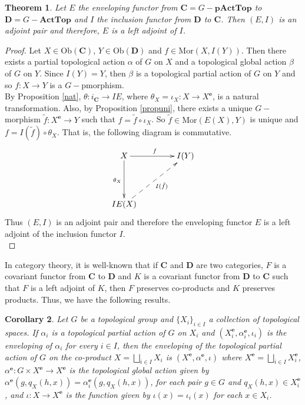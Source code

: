 \documentclass[sn-mathphys-num]{sn-jnl}%
\theoremstyle{thmstyleone}%
\newtheorem{theorem}{Theorem}%
\newtheorem{corollary}[theorem]{Corollary}%
\theoremstyle{thmstyletwo}%
\theoremstyle{thmstylethree}%
\begin{document}
\begin{theorem}\label{adjizq}
Let $E$ the enveloping functor from $\mathbf{C}=G-\mathbf{pActTop}$ to $\mathbf{D}=G-\mathbf{ActTop}$  and $I$
the inclusion functor from $\mathbf{D}$ to $\mathbf{C}$. Then $(E,I)$ is an adjoint pair and therefore, $ E $ is a left adjoint  of $ I $.
\end{theorem}
\begin{proof}
Let $X\in \text{Ob}(\mathbf{C})$, $Y\in \text{Ob}(\mathbf{D})$ and $f\in\text{Mor}(X,I(Y))$.  Then there exists a partial topological action $ \alpha $ of $ G $ on $ X $ and a topological global  action $\beta $ of $ G $ on $ Y $. Since $ I (Y) = Y $, then $\beta$ is a topological partial action of $ G $ on $ Y $ and so $ f: X \to Y $ is a $G-$pmorphism.\\

By Proposition \ref{nat}, $\theta: i_{\mathbf{C}} \to IE$, where $\theta_X=\iota_X:X\to X^\mathbf{e}$,
 is a natural transformation. Also, by Proposition \ref{propuni}, there exists a unique $ G-$morphism $\tilde{f}:X^\mathbf{e}\to Y$ such that $f=\tilde{f}\circ \iota_X$. So $\tilde{f}\in \text{Mor}(E(X),Y)$ is unique and $f=I(\tilde{f})\circ \theta_X$. That is, the following diagram is commutative.
$$
\xymatrix@=1.5cm{
X \ar[r]^f \ar[d]_{\theta_X} & I(Y)\\
IE(X)\ar@{-->}[ur]_{I(\tilde{f})}&
}
$$
Thus $(E,I)$ is an adjoint pair and therefore the enveloping functor $E$ is a left adjoint of the inclusion functor $I$.\\
\end{proof}
In category theory, it is well-known that if $\mathbf{C}$ and $\mathbf{D}$ are two categories, $ F $ is a covariant functor from $\mathbf{C}$  to \textbf{D} and $K$ is a covariant functor from $\mathbf{D}$ to $\mathbf{C}$ such that $ F $ is a left adjoint of $ K$, then $ F $ preserves co-products and $ K $ preserves products. Thus,  we have the following results.\\
\begin{corollary}
Let $ G $ be a topological group and $\{X_i\}_{i\in I}$ a collection of topological spaces. If $ \alpha_i $ is a topological partial action of $ G $ on $ X_i $ and $(X_i^\mathbf{e},\alpha^\mathbf{e}_i,\iota_i)$ is the enveloping of $ \alpha_i $ for every $ i \in I $, then the enveloping of the topological partial action of $ G $ on the co-product  $X=\bigsqcup_{i\in I}X_i$ is $(X^\mathbf{e},\alpha^\mathbf{e},\iota)$ where $X^\mathbf{e}=\bigsqcup_{i\in I}X_i^\mathbf{e}$, $\alpha^\mathbf{e}:G\times X^\mathbf{e}\to X^\mathbf{e}$ is the topological global  action given by $\alpha^\mathbf{e}(g,q_X(h,x))=\alpha^\mathbf{e}_{i}(g,q_X(h,x))$, for each pair $g\in G$ and $q_X(h,x)\in X_i^\mathbf{e}$, and $\iota:X\to X^\mathbf{e}$
is the function given by  $\iota(x)=\iota_{i}(x)$ for each $x\in X_i$.\\
\end{corollary}
\end{document}
